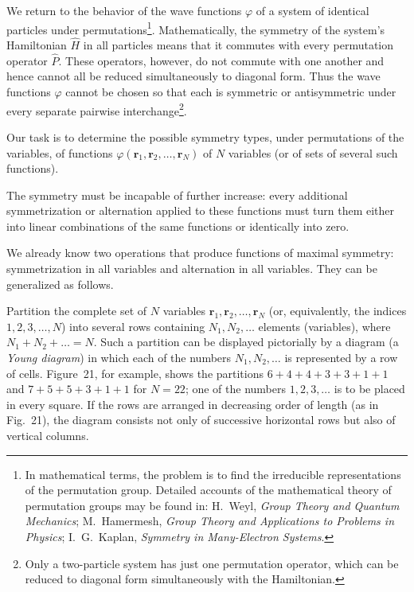 We return to the behavior of the wave functions $\varphi$ of a system of identical particles under permutations\footnote{In mathematical terms, the problem is to find the irreducible representations of the permutation group. Detailed accounts of the mathematical theory of permutation groups may be found in: H.~Weyl, \emph{Group Theory and Quantum Mechanics}; M.~Hamermesh, \emph{Group Theory and Applications to Problems in Physics}; I.~G.~Kaplan, \emph{Symmetry in Many-Electron Systems}.}. Mathematically, the symmetry of the system's Hamiltonian $\widehat H$ in all particles means that it commutes with every permutation operator $\widehat P$. These operators, however, do not commute with one another and hence cannot all be reduced simultaneously to diagonal form. Thus the wave functions $\varphi$ cannot be chosen so that each is symmetric or antisymmetric under every separate pairwise interchange\footnote{Only a two-particle system has just one permutation operator, which can be reduced to diagonal form simultaneously with the Hamiltonian.}.

Our task is to determine the possible symmetry types, under permutations of the variables, of functions $\varphi(\mathbf r_1,\mathbf r_2,\ldots,\mathbf r_N)$ of $N$ variables (or of sets of several such functions).

The symmetry must be incapable of further increase: every additional symmetrization or alternation applied to these functions must turn them either into linear combinations of the same functions or identically into zero.

We already know two operations that produce functions of maximal symmetry: symmetrization in all variables and alternation in all variables. They can be generalized as follows.

Partition the complete set of $N$ variables $\mathbf r_1,\mathbf r_2,\ldots,\mathbf r_N$ (or, equivalently, the indices $1,2,3,\ldots,N$) into several rows containing $N_1,N_2,\ldots$ elements (variables), where $N_1+N_2+\ldots=N$. Such a partition can be displayed pictorially by a diagram (a \emph{Young diagram}) in which each of the numbers $N_1,N_2,\ldots$ is represented by a row of cells. Figure~21, for example, shows the partitions $6+4+4+3+3+1+1$ and $7+5+5+3+1+1$ for $N=22$; one of the numbers $1,2,3,\ldots$ is to be placed in every square. If the rows are arranged in decreasing order of length (as in Fig.~21), the diagram consists not only of successive horizontal rows but also of vertical columns.

